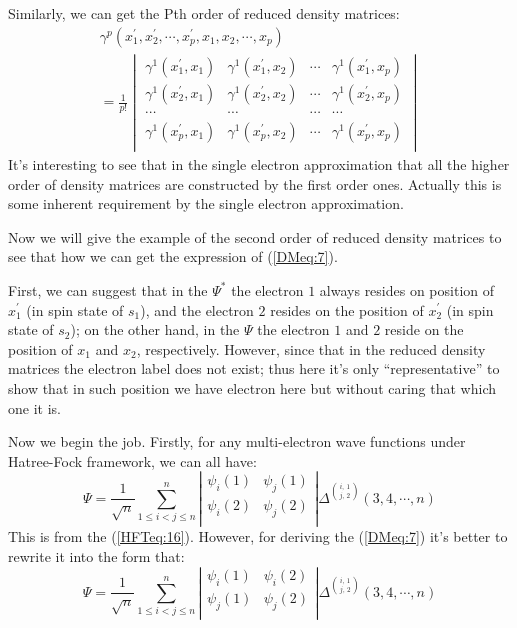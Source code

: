 Similarly, we can get the Pth order of reduced density matrices:
\begin{multline}\label{DMeq:7}
  \gamma^{p}(x^{'}_{1}, x^{'}_{2}, \cdots, x^{'}_{p}, x_{1}, x_{2},
  \cdots, x_{p}) \\
  = \frac{1}{p!}
  \begin{vmatrix}
    \gamma^{1}(x^{'}_{1},x_{1}) & \gamma^{1}(x^{'}_{1},x_{2}) & \cdots
    &
    \gamma^{1}(x^{'}_{1},x_{p}) \\
    \gamma^{1}(x^{'}_{2},x_{1}) & \gamma^{1}(x^{'}_{2},x_{2}) & \cdots
    &
    \gamma^{1}(x^{'}_{2},x_{p}) \\
    \cdots & \cdots & \cdots &
    \cdots \\
    \gamma^{1}(x^{'}_{p},x_{1}) & \gamma^{1}(x^{'}_{p},x_{2}) & \cdots
    &
    \gamma^{1}(x^{'}_{p},x_{p}) \\
  \end{vmatrix}
\end{multline}
It's interesting to see that in the single electron approximation
that all the higher order of density matrices are constructed by the
first order ones. Actually this is some inherent requirement by the
single electron approximation.

Now we will give the example of the second order of reduced density
matrices to see that how we can get the expression of (\ref{DMeq:7}).

First, we can suggest that in the $\Psi^{*}$ the electron $1$ always
resides on position of $x_{1}^{'}$ (in spin state of $s_{1}$), and
the electron $2$ resides on the position of $x_{2}^{'}$ (in spin
state of $s_{2}$); on the other hand, in the $\Psi$ the electron $1$
and $2$ reside on the position of $x_{1}$ and $x_{2}$, respectively.
However, since that in the reduced density matrices the electron
label does not exist; thus here it's only ``representative'' to show
that in such position we have electron here but without caring that
which one it is.

Now we begin the job. Firstly, for any multi-electron wave functions
under Hatree-Fock framework, we can all have:
\begin{equation}\label{}
  \Psi = \dfrac{1}{\sqrt{n}}\sum^{n}_{1 \leq i<j \leq n}\left|
    \begin{array}{cc}
      \psi_{i}(1) & \psi_{j}(1) \\
      \psi_{i}(2) & \psi_{j}(2) \\
    \end{array}
  \right|
  \Delta^{
    i,\,1 \choose
    j,\,2 }
  (3,4,\cdots,n)
\end{equation}
This is from the (\ref{HFTeq:16}). However, for deriving the
(\ref{DMeq:7}) it's better to rewrite it into the form that:
\begin{equation}\label{}
  \Psi = \dfrac{1}{\sqrt{n}}\sum^{n}_{1 \leq i<j \leq n}\left|
    \begin{array}{cc}
      \psi_{i}(1) & \psi_{i}(2) \\
      \psi_{j}(1) & \psi_{j}(2) \\
    \end{array}
  \right|
  \Delta^{
    i,\,1 \choose
    j,\,2 }
  (3,4,\cdots,n)
\end{equation}

